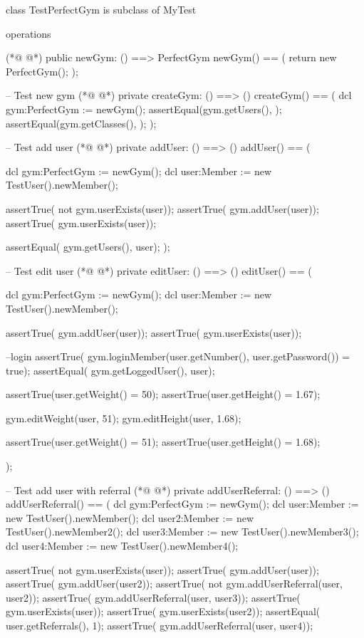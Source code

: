 \begin{vdmpp}[breaklines=true]
class TestPerfectGym is subclass of MyTest
 
operations
 
(*@
\label{newGym:5}
@*)
  public newGym: () ==> PerfectGym
 newGym() == (
  return new PerfectGym();
 );
 
 -- Test new gym
(*@
\label{createGym:11}
@*)
 private createGym: () ==> ()
 createGym() == (
  dcl gym:PerfectGym := newGym();
  assertEqual(gym.getUsers(), {});
  assertEqual(gym.getClasses(), {});
 );
 
 -- Test add user
(*@
\label{addUser:19}
@*)
 private addUser: () ==> ()
 addUser() == (
    
    dcl gym:PerfectGym := newGym();
    dcl user:Member := new TestUser().newMember();
    
    assertTrue( not gym.userExists(user));
    assertTrue( gym.addUser(user));
    assertTrue( gym.userExists(user));
    
    assertEqual( gym.getUsers(), {user});
 );
 
 -- Test edit user
(*@
\label{editUser:33}
@*)
 private editUser: () ==> ()
 editUser() == (
    
    dcl gym:PerfectGym := newGym();
    dcl user:Member := new TestUser().newMember();
    
    assertTrue( gym.addUser(user));
    assertTrue( gym.userExists(user));
     
    --login
    assertTrue( gym.loginMember(user.getNumber(), user.getPassword()) = true);
     assertEqual( gym.getLoggedUser(), user); 
   
    assertTrue(user.getWeight() = 50);
    assertTrue(user.getHeight() = 1.67); 
    
    gym.editWeight(user, 51);
    gym.editHeight(user, 1.68);
    
    assertTrue(user.getWeight() = 51);
    assertTrue(user.getHeight() = 1.68); 
    
 );
 
 -- Test add user with referral
(*@
\label{addUserReferral:58}
@*)
 private addUserReferral: () ==> ()
 addUserReferral() == (
   dcl gym:PerfectGym := newGym();
   dcl user:Member := new TestUser().newMember();
   dcl user2:Member := new TestUser().newMember2();
   dcl user3:Member := new TestUser().newMember3();
   dcl user4:Member := new TestUser().newMember4();
    
   assertTrue( not gym.userExists(user));
   assertTrue( gym.addUser(user));
   assertTrue( gym.addUser(user2));
   assertTrue( not gym.addUserReferral(user, user2));
   assertTrue( gym.addUserReferral(user, user3));
   assertTrue( gym.userExists(user));
   assertTrue( gym.userExists(user2));
   assertEqual( user.getReferrals(), 1);
   assertTrue( gym.addUserReferral(user, user4));
   

\end{vdmpp}
